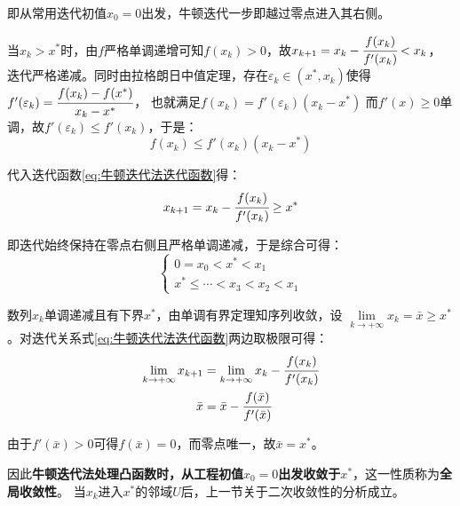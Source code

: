 即从常用迭代初值\(x_0=0\)出发，牛顿迭代一步即越过零点进入其右侧。

当\(x_k>x^*\)时，由\(f\)严格单调递增可知\(f(x_k)>0\)，故\(x_{k+1}=x_k-\cfrac{f(x_k)}{f'(x_k)}<x_k\)，
迭代严格递减。同时由拉格朗日中值定理，存在\(\varepsilon_k\in(x^*,x_k)\)使得\(f'(\varepsilon_k)=\cfrac{f(x_k)-f(x^*)}{x_k-x^*}\)，
也就满足\(f(x_k)=f'(\varepsilon_k)(x_k-x^*)\)
而\(f'(x)\ge 0\)单调，故\(f'(\varepsilon_k)\le f'(x_k)\)，于是：
\begin{equation*}
    f(x_k)\le f'(x_k)(x_k-x^*)
\end{equation*}

代入迭代函数\eqref{eq:牛顿迭代法迭代函数}得：
\begin{equation*}
    x_{k+1}=x_k-\cfrac{f(x_k)}{f'(x_k)}\ge x^*
\end{equation*}

即迭代始终保持在零点右侧且严格单调递减，于是综合可得：
\begin{equation*}
    \begin{cases}
        0=x_0<x^*<x_1\\
        x^*\le\cdots<x_3<x_2<x_1
    \end{cases}
\end{equation*}

数列\(x_k\)单调递减且有下界\(x^*\)，由单调有界定理知序列收敛，设
\(\lim\limits_{k\to+\infty}x_k=\bar{x}\ge x^*\)。对迭代关系式\eqref{eq:牛顿迭代法迭代函数}两边取极限可得：
\begin{align*}
    \lim\limits_{k\to+\infty}x_{k+1}&=\lim\limits_{k\to+\infty}x_k-\cfrac{f(x_k)}{f'(x_k)}\\
    \bar{x}&=\bar{x}-\cfrac{f(\bar{x})}{f'(\bar{x})}
\end{align*}

由于\(f'(\bar{x})>0\)可得\(f(\bar{x})=0\)，而零点唯一，故\(\bar{x}=x^*\)。

因此\textbf{牛顿迭代法处理凸函数时，从工程初值\(x_0=0\)出发收敛于\(x^*\)}，这一性质称为\textbf{全局收敛性}。
当\(x_k\)进入\(x^*\)的邻域\(U\)后，上一节关于二次收敛性的分析成立。